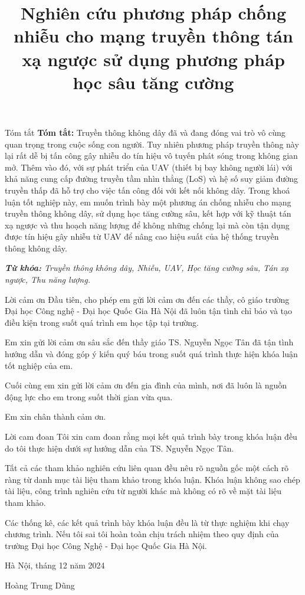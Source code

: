 \documentclass{uetgraduation}
\begin{document}
\title{Nghiên cứu phương pháp chống nhiễu cho mạng truyền thông tán xạ ngược sử dụng phương pháp học sâu tăng cường}
\makecovers
\begin{preamble}{Tóm tắt}
\textbf{Tóm tắt:} Truyền thông không dây đã và đang đóng vai trò vô cùng quan trọng trong cuộc sống con người. Tuy
nhiên phương pháp truyền thông này lại rất dễ bị tấn công gây nhiễu do tín hiệu vô tuyến phát sóng trong không gian mở.
Thêm vào đó, với sự phát triển của UAV (thiết bị bay không người lái) với khả năng cung cấp đường truyền tầm nhìn thẳng
(LoS) và hệ số suy giảm đường truyền thấp đã hỗ trợ cho việc tấn công đối với kết nối không dây. Trong khoá luận tốt nghiệp
này, em muốn trình bày một phương án chống nhiễu cho mạng truyền thông không dây, sử dụng học tăng cường sâu, kết hợp với
kỹ thuật tán xạ ngược và thu hoạch năng lượng để không những chống lại mà còn tận dụng được tín hiệu gây nhiễu từ UAV 
để nâng cao hiệu suất của hệ thống truyền thông không dây.

\textit{\textbf{Từ khóa:} Truyền thông không dây, Nhiễu, UAV, Học tăng cường sâu, Tán xạ ngược, Thu năng lượng.}
\end{preamble}
\begin{preamble}{Lời cảm ơn}
    Đầu tiên, cho phép em gửi lời cảm ơn đến các thầy, cô giáo trường Đại học Công nghệ - Đại học
    Quốc Gia Hà Nội đã luôn tận tình chỉ bảo và tạo điều kiện trong suốt quá trình em học
    tập tại trường.
    
    Em xin gửi lời cảm ơn sâu sắc đến thầy giáo TS. Nguyễn Ngọc Tân đã tận tình
    hướng dẫn và đóng góp ý kiến quý báu trong suốt quá trình thực hiện khóa luận tốt
    nghiệp của em.
    
    Cuối cùng em xin gửi lời cảm ơn đến gia đình của mình, nơi đã luôn là nguồn động lực cho em
    trong suốt thời gian vừa qua.
    
    Em xin chân thành cảm ơn.
\end{preamble}
\begin{preamble}{Lời cam đoan}
Tôi xin cam đoan rằng mọi kết quả trình bày trong khóa luận đều do tôi thực hiện
dưới sự hướng dẫn của TS. Nguyễn Ngọc Tân.

Tất cả các tham khảo nghiên cứu liên quan đều nêu rõ nguồn gốc một cách rõ ràng từ 
danh mục tài liệu tham khảo trong khóa luận. Khóa luận không sao chép tài liệu, 
công trình nghiên cứu từ người khác mà không có rõ về mặt tài liệu tham khảo.

Các thống kê, các kết quả trình bày khóa luận đều là từ thực nghiệm khi chạy chương trình. Nếu tôi sai 
tôi hoàn toàn chịu trách nhiệm theo quy định của trường Đại học Công Nghệ - Đại học Quốc Gia Hà Nội.

\begin{flushright}
    Hà Nội, tháng 12 năm 2024

    \vspace{45pt}
    Hoàng Trung Dũng
\end{flushright}
\end{preamble}
\end{document}
